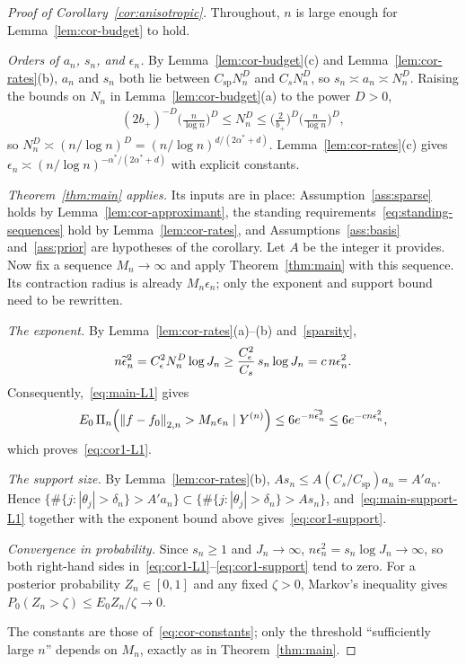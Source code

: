 \begin{proof}[Proof of Corollary~\ref{cor:anisotropic}]
Throughout, $n$ is large enough for Lemma~\ref{lem:cor-budget} to hold.

\emph{Orders of $a_n$, $s_n$, and $\epsilon_n$.} By Lemma~\ref{lem:cor-budget}(c) and Lemma~\ref{lem:cor-rates}(b), $a_n$ and $s_n$ both lie between $C_{\mathrm{sp}}N_n^D$ and $C_sN_n^D$, so $s_n\asymp a_n\asymp N_n^D$. Raising the bounds on $N_n$ in Lemma~\ref{lem:cor-budget}(a) to the power $D>0$,
\begin{align*}
(2b_+)^{-D}\Big(\frac n{\log n}\Big)^D\leq N_n^D\leq\Big(\frac2{b_+}\Big)^D\Big(\frac n{\log n}\Big)^D,
\end{align*}
so $N_n^D\asymp(n/\log n)^{D}=(n/\log n)^{d/(2\alpha^*+d)}$. Lemma~\ref{lem:cor-rates}(c) gives $\epsilon_n\asymp(n/\log n)^{-\alpha^*/(2\alpha^*+d)}$ with explicit constants.

\emph{Theorem~\ref{thm:main} applies.} Its inputs are in place: Assumption~\ref{ass:sparse} holds by Lemma~\ref{lem:cor-approximant}, the standing requirements~\eqref{eq:standing-sequences} hold by Lemma~\ref{lem:cor-rates}, and Assumptions~\ref{ass:basis} and~\ref{ass:prior} are hypotheses of the corollary. Let $A$ be the integer it provides. Now fix a sequence $M_n\to\infty$ and apply Theorem~\ref{thm:main} with this sequence. Its contraction radius is already $M_n\epsilon_n$; only the exponent and support bound need to be rewritten.

\emph{The exponent.} By Lemma~\ref{lem:cor-rates}(a)--(b) and~\eqref{sparsity},
\begin{align*}
n\widetilde{\epsilon}_n^2=C_\epsilon^2N_n^D\log J_n
\geq\frac{C_\epsilon^2}{C_s}\,s_n\log J_n
=c\,n\epsilon_n^2.
\end{align*}
Consequently,~\eqref{eq:main-L1} gives
\begin{align*}
E_0\,\Pi_n\!\left(\left\lVert f-f_0 \right\rVert_{2,n}>M_n\epsilon_n\mid Y^{(n)}\right)
\leq6e^{-n\widetilde{\epsilon}_n^2}\leq6e^{-c n\epsilon_n^2},
\end{align*}
which proves~\eqref{eq:cor1-L1}.

\emph{The support size.} By Lemma~\ref{lem:cor-rates}(b), $As_n\leq A(C_s/C_{\mathrm{sp}})a_n=A'a_n$. Hence $\{\#\{j:|\theta_j|>\delta_n\}>A'a_n\}\subset\{\#\{j:|\theta_j|>\delta_n\}>As_n\}$, and~\eqref{eq:main-support-L1} together with the exponent bound above gives~\eqref{eq:cor1-support}.

\emph{Convergence in probability.} Since $s_n\geq1$ and $J_n\to\infty$, $n\epsilon_n^2=s_n\log J_n\to\infty$, so both right-hand sides in~\eqref{eq:cor1-L1}--\eqref{eq:cor1-support} tend to zero. For a posterior probability $Z_n\in[0,1]$ and any fixed $\zeta>0$, Markov's inequality gives $P_0(Z_n>\zeta)\leq E_0Z_n/\zeta\to0$.

The constants are those of~\eqref{eq:cor-constants}; only the threshold ``sufficiently large $n$'' depends on $M_n$, exactly as in Theorem~\ref{thm:main}.
\end{proof}

